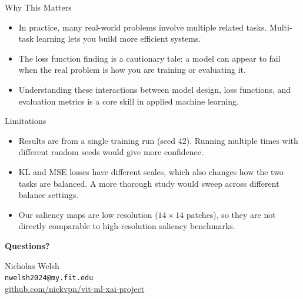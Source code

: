 \documentclass{beamer}
\begin{document}
\begin{frame}{Why This Matters}
\begin{itemize}
  \item In practice, many real-world problems involve multiple related tasks. Multi-task learning lets you build more efficient systems.
  \item The loss function finding is a cautionary tale: a model can appear to fail when the real problem is how you are training or evaluating it.
  \item Understanding these interactions between model design, loss functions, and evaluation metrics is a core skill in applied machine learning.
\end{itemize}
\end{frame}

\begin{frame}{Limitations}
\begin{itemize}
  \item Results are from a single training run (seed 42). Running multiple times with different random seeds would give more confidence.
  \item KL and MSE losses have different scales, which also changes how the two tasks are balanced. A more thorough study would sweep across different balance settings.
  \item Our saliency maps are low resolution ($14 \times 14$ patches), so they are not directly comparable to high-resolution saliency benchmarks.
\end{itemize}
\end{frame}

\begin{frame}
\begin{center}
\Large\textbf{Questions?}

\vfill
\normalsize
Nicholas Welsh \\
\texttt{nwelsh2024@my.fit.edu} \\
\vspace{0.5cm}
\href{https://github.com/nickvpn/vit-ml-xai-project}{github.com/nickvpn/vit-ml-xai-project}
\end{center}
\end{frame}
\end{document}
